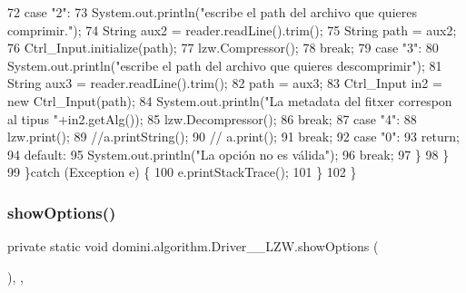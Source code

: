 \begin{DoxyCode}
72                 \textcolor{keywordflow}{case} \textcolor{stringliteral}{"2"}:
73                     System.out.println(\textcolor{stringliteral}{"escribe el path del archivo que quieres comprimir."});
74                     String aux2 = reader.readLine().trim();
75                     String path = aux2;
76                     Ctrl\_Input.initialize(path);
77                     lzw.Compressor();
78                 \textcolor{keywordflow}{break};
79                 \textcolor{keywordflow}{case} \textcolor{stringliteral}{"3"}:
80                     System.out.println(\textcolor{stringliteral}{"escribe el path del archivo que quieres descomprimir"});
81                     String aux3 = reader.readLine().trim();
82                     path = aux3;
83                     Ctrl\_Input in2 = \textcolor{keyword}{new} Ctrl\_Input(path);
84                     System.out.println(\textcolor{stringliteral}{"La metadata del fitxer correspon al tipus "}+in2.getAlg());
85                     lzw.Decompressor();
86                 \textcolor{keywordflow}{break};
87                 \textcolor{keywordflow}{case} \textcolor{stringliteral}{"4"}:
88                     lzw.print();
89                     \textcolor{comment}{//a.printString();}
90                     \textcolor{comment}{// a.print();                   }
91                 \textcolor{keywordflow}{break};
92                 \textcolor{keywordflow}{case} \textcolor{stringliteral}{"0"}:
93                     \textcolor{keywordflow}{return};
94                 \textcolor{keywordflow}{default}:
95                     System.out.println(\textcolor{stringliteral}{"La opción no es válida"});
96                 \textcolor{keywordflow}{break};
97             \}
98         \}
99     \}\textcolor{keywordflow}{catch} (Exception e) \{
100         e.printStackTrace();
101     \}
102     \}
\end{DoxyCode}
\mbox{\label{classdomini_1_1algorithm_1_1Driver____LZW_ad43ebe1afd0d4e5be51584c71a1789d2}} 
\subsubsection{\texorpdfstring{show\+Options()}{showOptions()}}
{\footnotesize\ttfamily private static void domini.\+algorithm.\+Driver\+\_\+\+\_\+\+L\+Z\+W.\+show\+Options (\begin{DoxyParamCaption}{ }\end{DoxyParamCaption})\hspace{0.3cm}{\ttfamily [inline]}, {\ttfamily [static]}, {\ttfamily [private]}}



